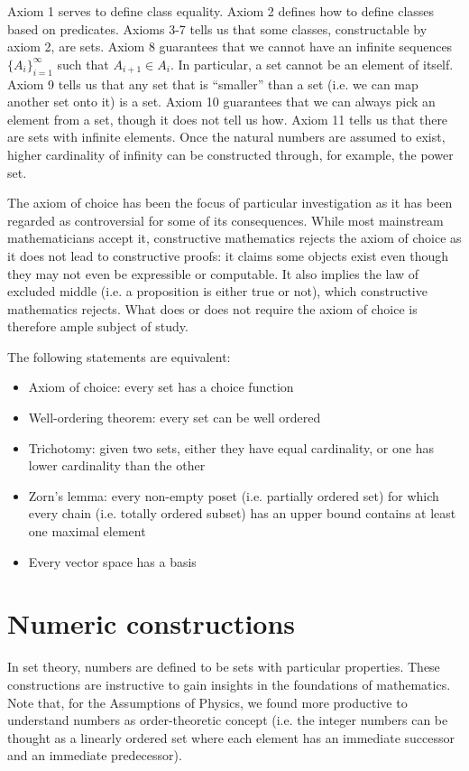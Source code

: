 \documentclass{article}
\begin{document}
\begin{remark}
	Axiom 1 serves to define class equality. Axiom 2 defines how to define classes based on predicates. Axioms 3-7 tells us that some classes, constructable by axiom 2, are sets. Axiom 8 guarantees that we cannot have an infinite sequences $\{ A_i \}_{i=1}^\infty$ such that $A_{i+1} \in A_i$. In particular, a set cannot be an element of itself. Axiom 9 tells us that any set that is ``smaller'' than a set (i.e. we can map another set onto it) is a set. Axiom 10 guarantees that we can always pick an element from a set, though it does not tell us how. Axiom 11 tells us that there are sets with infinite elements. Once the natural numbers are assumed to exist, higher cardinality of infinity can be constructed through, for example, the power set.
\end{remark}

The axiom of choice has been the focus of particular investigation as it has been regarded as controversial for some of its consequences. While most mainstream mathematicians accept it, constructive mathematics rejects the axiom of choice as it does not lead to constructive proofs: it claims some objects exist even though they may not even be expressible or computable. It also implies the law of excluded middle (i.e. a proposition is either true or not), which constructive mathematics rejects. What does or does not require the axiom of choice is therefore ample subject of study.

\begin{prop}
	The following statements are equivalent:
	\begin{itemize}
		\item Axiom of choice: every set has a choice function
		\item Well-ordering theorem: every set can be well ordered
		\item Trichotomy: given two sets, either they have equal cardinality, or one has lower cardinality than the other
		\item Zorn's lemma: every non-empty poset (i.e. partially ordered set) for which every chain (i.e. totally ordered subset) has an upper bound contains at least one maximal element
		\item Every vector space has a basis
	\end{itemize}
\end{prop}

\section{Numeric constructions}
In set theory, numbers are defined to be sets with particular properties. These constructions are instructive to gain insights in the foundations of mathematics. Note that, for the Assumptions of Physics, we found more productive to understand numbers as order-theoretic concept (i.e. the integer numbers can be thought as a linearly ordered set where each element has an immediate successor and an immediate predecessor).
\end{document}
